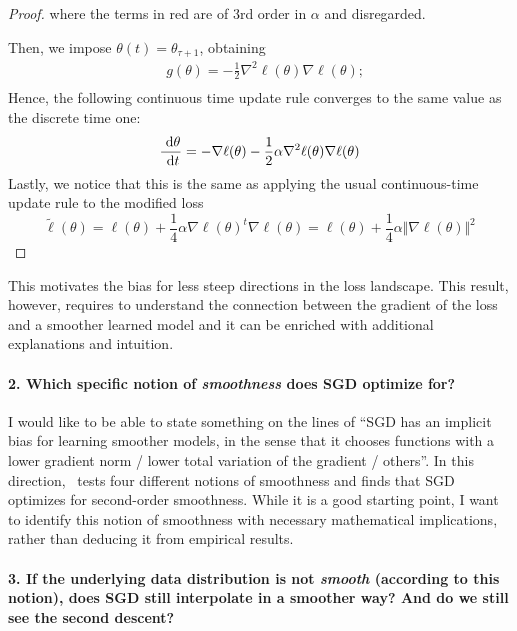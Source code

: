 \documentclass{amsart}
\begin{document}
\begin{proposition}
\begin{proof}
where the terms in red are of 3rd order in $\alpha$ and disregarded.

Then, we impose $\theta(t) = \theta_{\tau+1}$, obtaining
\begin{align*}
    & g(\theta) = -\frac{1}{2}\nabla^2\ell(\theta) \nabla\ell(\theta) ;\\
\end{align*}
Hence, the following continuous time update rule converges to the same value as the discrete time one:
\begin{equation}
    \frac{\mathop{}\!\,\,\mathrm{d} \theta}{\mathop{}\!\,\,\mathrm{d} t} = -\nabla\ell(\theta) - \frac{1}{2}\alpha\nabla^2\ell(\theta)\nabla\ell(\theta)
\end{equation}
Lastly, we notice that this is the same as applying the usual continuous-time update rule to the modified loss
\[
\tilde\ell(\theta) = \ell(\theta) + \frac{1}{4}\alpha\nabla\ell{(\theta)}^t \nabla\ell(\theta) = \ell(\theta) + \frac{1}{4}\alpha\big\Vert\nabla\ell(\theta) \big\Vert^2
\]
\end{proof}
\end{proposition}

This motivates the bias for less steep directions in the loss landscape. 
This result, however, requires to understand the connection between the gradient of the loss and a smoother learned model 
and it can be enriched with additional explanations and intuition.

\paragraph{\bf 2. Which specific notion of \textit{smoothness} does SGD optimize for?}
I would like to be able to state something on the lines of ``SGD has an implicit bias for learning smoother models, in the sense that it chooses functions with a lower gradient norm / lower total variation of the gradient / others''. In this direction,~\cite{notions} tests four different notions of smoothness and finds that SGD optimizes for second-order smoothness. While it is a good starting point, I want to identify this notion of smoothness with necessary mathematical implications, rather than deducing it from empirical results.

\paragraph{3. If the underlying data distribution is not \textit{smooth} (according to this notion), does SGD still interpolate in a smoother way? And do we still see the second descent?}
\end{document}
